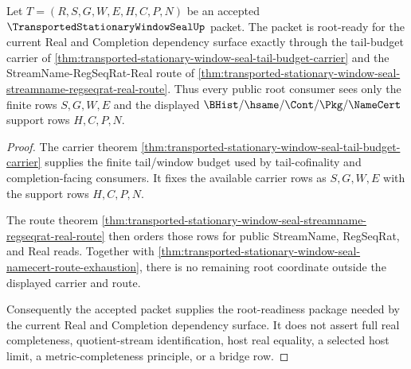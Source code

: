 \begin{theorem}
\label{thm:transported-stationary-window-seal-root-readiness-package}
Let $T=(R,S,G,W,E,H,C,P,N)$ be an accepted $\TransportedStationaryWindowSealUp$ packet. The packet is root-ready for the current Real and Completion dependency surface exactly through the tail-budget carrier of \autoref{thm:transported-stationary-window-seal-tail-budget-carrier} and the StreamName-RegSeqRat-Real route of \autoref{thm:transported-stationary-window-seal-streamname-regseqrat-real-route}. Thus every public root consumer sees only the finite rows $S,G,W,E$ and the displayed $\BHist/\hsame/\Cont/\Pkg/\NameCert$ support rows $H,C,P,N$.
\end{theorem}
\begin{proof}
The carrier theorem \autoref{thm:transported-stationary-window-seal-tail-budget-carrier} supplies the finite tail/window budget used by tail-cofinality and completion-facing consumers. It fixes the available carrier rows as $S,G,W,E$ with the support rows $H,C,P,N$.

The route theorem \autoref{thm:transported-stationary-window-seal-streamname-regseqrat-real-route} then orders those rows for public StreamName, RegSeqRat, and Real reads. Together with \autoref{thm:transported-stationary-window-seal-namecert-route-exhaustion}, there is no remaining root coordinate outside the displayed carrier and route.

Consequently the accepted packet supplies the root-readiness package needed by the current Real and Completion dependency surface. It does not assert full real completeness, quotient-stream identification, host real equality, a selected host limit, a metric-completeness principle, or a bridge row.
\end{proof}
